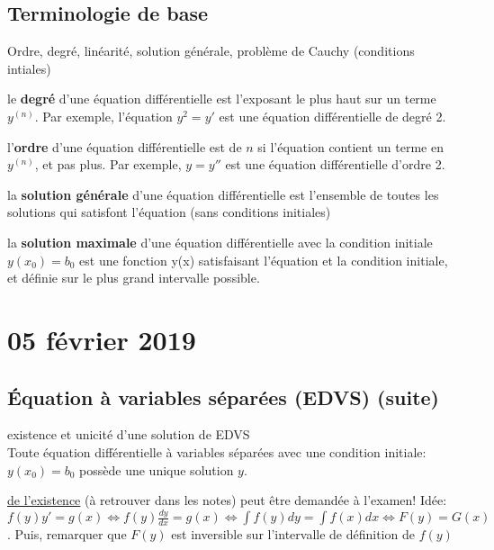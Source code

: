 \documentclass{report}
\begin{document}
\subsection{Terminologie de base} %
Ordre, degré, linéarité, solution générale, problème de Cauchy (conditions intiales) \\
\begin{defn} le \textbf{degré} d'une équation différentielle est l'exposant le plus haut sur un terme $y^{(n)}$. Par exemple, l'équation $y^2 = y'$ est une équation différentielle de degré 2. 
\end{defn}
\begin{defn} l'\textbf{ordre} d'une équation différentielle est de $n$ si l'équation contient un terme en $y^{(n)}$, et pas plus. Par exemple, $y = y''$ est une équation différentielle d'ordre 2.
\end{defn}
\begin{defn} la \textbf{solution générale} d'une équation différentielle est l'ensemble de toutes les solutions qui satisfont l'équation (sans conditions initiales)
\end{defn}
\begin{defn} la \textbf{solution maximale} d'une équation différentielle avec la condition initiale $y(x_0) = b_0$ est une fonction y(x) satisfaisant l'équation et la condition initiale, et définie sur le plus grand intervalle possible.
\end{defn}

\section{05 février 2019}

\subsection{Équation à variables séparées (EDVS) (suite)}
\begin{thm} existence et unicité d'une solution de EDVS \\
Toute équation différentielle à variables séparées avec une condition initiale: $y(x_0) = b_0$ possède une unique solution $y$. \\
\begin{attention} \underline{de l'existence} (à retrouver dans les notes) peut être demandée à l'examen! Idée: $f(y)y' = g(x) \iff f(y)\frac{dy}{dx} = g(x) \iff \int f(y)dy = \int f(x)dx \iff F(y) = G(x)$. Puis, remarquer que $F(y)$ est inversible sur l'intervalle de définition de $f(y)$
\end{attention}
\end{thm}
\end{document}

